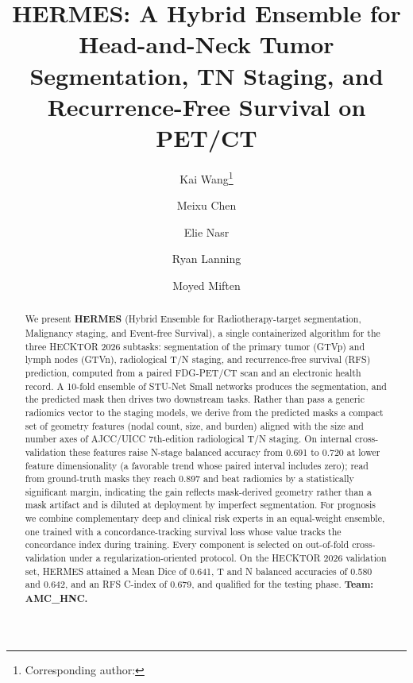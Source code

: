 \documentclass[runningheads]{llncs}
\begin{document}
\title{HERMES: A Hybrid Ensemble for Head-and-Neck Tumor Segmentation, TN Staging, and Recurrence-Free Survival on PET/CT}


\author{Kai Wang\thanks{Corresponding author: } \and
Meixu Chen \and
Elie Nasr \and
Ryan Lanning \and
Moyed Miften}



\maketitle

\begin{abstract}
We present \textbf{HERMES} (Hybrid Ensemble for Radiotherapy-target segmentation, Malignancy staging, and Event-free Survival), a single containerized algorithm for the three HECKTOR 2026 subtasks: segmentation of the primary tumor (GTVp) and lymph nodes (GTVn), radiological T/N staging, and recurrence-free survival (RFS) prediction, computed from a paired FDG-PET/CT scan and an electronic health record. A 10-fold ensemble of STU-Net Small networks produces the segmentation, and the predicted mask then drives two downstream tasks. Rather than pass a generic radiomics vector to the staging models, we derive from the predicted masks a compact set of geometry features (nodal count, size, and burden) aligned with the size and number axes of AJCC/UICC 7th-edition radiological T/N staging. On internal cross-validation these features raise N-stage balanced accuracy from 0.691 to 0.720 at lower feature dimensionality (a favorable trend whose paired interval includes zero); read from ground-truth masks they reach 0.897 and beat radiomics by a statistically significant margin, indicating the gain reflects mask-derived geometry rather than a mask artifact and is diluted at deployment by imperfect segmentation. For prognosis we combine complementary deep and clinical risk experts in an equal-weight ensemble, one trained with a concordance-tracking survival loss whose value tracks the concordance index during training. Every component is selected on out-of-fold cross-validation under a regularization-oriented protocol. On the HECKTOR 2026 validation set, HERMES attained a Mean Dice of 0.641, T and N balanced accuracies of 0.580 and 0.642, and an RFS C-index of 0.679, and qualified for the testing phase. \textbf{Team: AMC\_HNC.}

\end{abstract}
\end{document}
